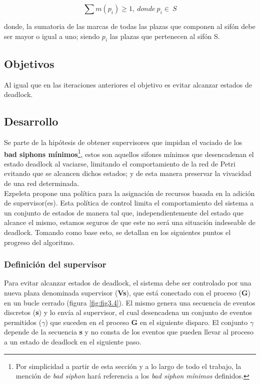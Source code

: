 \begin{equation}
    \sum m(p_i) \geq 1,\ donde \ p_i \in \ S  
\end{equation}

\noindent donde, la sumatoria de las marcas de todas las plazas que componen al sifón debe ser mayor o igual a uno; siendo $p_i$ las plazas que pertenecen al sifón S.

\subsection{Objetivos}
Al igual que en las iteraciones anteriores el objetivo es evitar alcanzar estados de deadlock.

\subsection{Desarrollo}
Se parte de la hipótesis de obtener supervisores que impidan el vaciado de los \textbf{bad siphons mínimos}\footnote{Por simplicidad a partir de esta sección y a lo largo de todo el trabajo, la mención de \textit{bad siphon} hará referencia a los \textit{bad siphon mínimos} definidos.}, estos son aquellos sifones mínimos que desencadenan el estado deadlock al vaciarse, limitando el comportamiento de la red de Petri evitando que se alcancen dichos estados; y de esta manera preservar la vivacidad de una red determinada. \\ 
Ezpeleta propone una política para la asignación de recursos basada en la adición de supervisor(es). Esta política de control limita el comportamiento del sistema a un conjunto de estados de manera tal que, independientemente del estado que alcance el mismo, estamos seguros de que este no será una situación indeseable de deadlock.
Tomando como base esto, se detallan en los siguientes puntos el progreso del algoritmo.


\subsubsection{Definición del supervisor} \label{sec:definicionsup}
Para evitar alcanzar estados de deadlock, el sistema debe ser controlado por una nueva plaza denominada supervisor (\textbf{Vs}), que está conectado con el proceso (\textbf{G}) en un bucle cerrado (figura \ref{fig:fig3.4}). El mismo genera una secuencia de eventos discretos (\textbf{s}) y lo envía al supervisor, el cual desencadena un conjunto de eventos permitidos ($\gamma$) que suceden en el proceso \textbf{G} en el siguiente disparo. El conjunto  $\gamma$ depende de la secuencia \textbf{s} y no consta de los eventos que pueden llevar al proceso a un estado de deadlock en el siguiente paso. 

